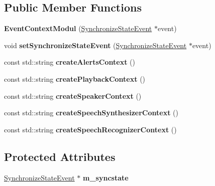\subsection*{Public Member Functions}
\begin{DoxyCompactItemize}
\item 
\mbox{\label{classAlexaEvent_1_1EventContextModul_a02e511856b413611c839fd7085bc985e}} 
{\bfseries Event\+Context\+Modul} (\hyperlink{structAlexaEvent_1_1SynchronizeStateEvent}{Synchronize\+State\+Event} $\ast$event)
\item 
\mbox{\label{classAlexaEvent_1_1EventContextModul_a7b4b22a163fb7105f41479d4578569f2}} 
void {\bfseries set\+Synchronize\+State\+Event} (\hyperlink{structAlexaEvent_1_1SynchronizeStateEvent}{Synchronize\+State\+Event} $\ast$event)
\item 
\mbox{\label{classAlexaEvent_1_1EventContextModul_ad6c3bc7bbcbcf88bf25e0c354545348b}} 
const std\+::string {\bfseries create\+Alerts\+Context} ()
\item 
\mbox{\label{classAlexaEvent_1_1EventContextModul_ad8ccd19d2b453612f5cd193214ba4972}} 
const std\+::string {\bfseries create\+Playback\+Context} ()
\item 
\mbox{\label{classAlexaEvent_1_1EventContextModul_ac06f43534bf08075503e193e34e1b224}} 
const std\+::string {\bfseries create\+Speaker\+Context} ()
\item 
\mbox{\label{classAlexaEvent_1_1EventContextModul_a4b6ee87f74a9c3cae917c57e3073425a}} 
const std\+::string {\bfseries create\+Speech\+Synthesizer\+Context} ()
\item 
\mbox{\label{classAlexaEvent_1_1EventContextModul_a37d6839a51c256ab43c128c75ab3b2ae}} 
const std\+::string {\bfseries create\+Speech\+Recognizer\+Context} ()
\end{DoxyCompactItemize}
\subsection*{Protected Attributes}
\begin{DoxyCompactItemize}
\item 
\mbox{\label{classAlexaEvent_1_1EventContextModul_a81d8704957452b951e8d65fea8375682}} 
\hyperlink{structAlexaEvent_1_1SynchronizeStateEvent}{Synchronize\+State\+Event} $\ast$ {\bfseries m\+\_\+syncstate}
\end{DoxyCompactItemize}


